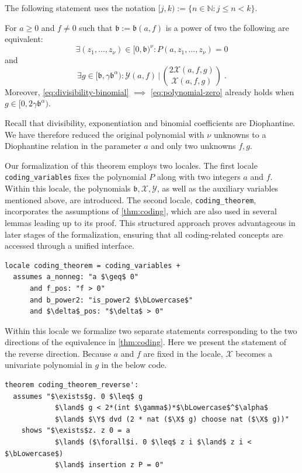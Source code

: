 \documentclass[a4paper,USenglish,cleveref,autoref,thm-restate]{lipics-v2021}
\newcommand{\N}{{\mathbb N}}
\newcommand{\thmIdec}{\mathscr}
\newcommand{\X}{\thmIdec X}
\newcommand{\Y}{\thmIdec Y}
\newcommand{\bLowercase}{\mathfrak{b}}
\begin{document}
The following statement uses the notation $[j, k) := \{ n \in \N : j \leq n < k \}$.

\begin{theorem} \label{thm:coding}
For $a \ge 0$ and $f \neq 0$ such that $\bLowercase := \bLowercase(a, f)$ is a power of two the following are equivalent:
\begin{equation} \label{eq:polynomial-zero}
	\exists (z_1,\ldots,z_\nu)\in [0, \bLowercase)^\nu \colon 
    P(a, z_1, \ldots, z_\nu) = 0 
\end{equation}
and
\begin{equation} \label{eq:divisibility-binomial}
	\exists g \in [\bLowercase, \gamma \bLowercase^\alpha) \colon  \Y(a, f) \, |\, \binom{2 \X(a, f, g)}{\X(a, f, g)} \;.
\end{equation}
Moreover, \eqref{eq:divisibility-binomial} $\implies $ \eqref{eq:polynomial-zero} already holds when $g \in [0, 2\gamma \bLowercase^\alpha)$.
\end{theorem}

Recall that divisibility, exponentiation and binomial coefficients are Diophantine. We have therefore reduced the original polynomial with $\nu$ unknowns to a Diophantine relation in the parameter $a$ and only two unknowns $f, g$.

Our formalization of this theorem employs two locales. The first locale \texttt{coding\_variables} fixes the polynomial $P$ along with two integers $a$ and $f$. Within this locale, the polynomials $\bLowercase, \X,\Y$, as well as the auxiliary variables mentioned above, are introduced. The second locale, \texttt{coding\_theorem}, incorporates the assumptions of \cref{thm:coding}, which are also used in several lemmas leading up to its proof. This structured approach proves advantageous in later stages of the formalization, ensuring that all coding-related concepts are accessed through a unified interface. 
\begin{lstlisting}
locale coding_theorem = coding_variables + 
  assumes a_nonneg: "a $\geq$ 0"
      and f_pos: "f > 0"
      and b_power2: "is_power2 $\bLowercase$"
      and $\delta$_pos: "$\delta$ > 0"
\end{lstlisting}

Within this locale we formalize two separate statements corresponding to the two directions of the equivalence in \cref{thm:coding}. Here we present the statement of the reverse direction. Because $a$ and $f$ are fixed in the locale, $\X$ becomes a univariate polynomial in $g$ in the below code.
\begin{lstlisting}
theorem coding_theorem_reverse':
  assumes "$\exists$g. 0 $\leq$ g 
            $\land$ g < 2*(int $\gamma$)*$\bLowercase$^$\alpha$ 
            $\land$ $\Y$ dvd (2 * nat ($\X$ g) choose nat ($\X$ g))"
    shows "$\exists$z. z 0 = a 
            $\land$ ($\forall$i. 0 $\leq$ z i $\land$ z i < $\bLowercase$) 
            $\land$ insertion z P = 0"
\end{lstlisting}
\end{document}
